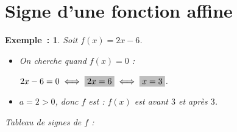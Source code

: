 \documentclass[12pt]{article}
\theoremstyle{break}
\theoremstyle{inline}
\newtheorem*{example*}{Exemple~:}
\begin{document}
\newpage

\section{Signe d'une fonction affine}

\begin{minipage}[c]{0.56\linewidth}
  \begin{example*}
    Soit $f(x) = 2x - 6$.

      \begin{itemize}
        \item On cherche quand $f(x) = 0$ :

        $2x - 6 = 0 \iff \hideM{2x = 6} \iff \hideM{x = 3}$.
        \item $a = 2 > 0$, donc $f$ est  : $f(x)$ est  avant $3$ et  après $3$.
      \end{itemize}

      \medskip
      Tableau de signes de $f$ :

      \begin{center}
      \end{center}
  \end{example*}
\end{minipage}
\hfill
\begin{minipage}[c]{0.4\linewidth}
  \centering
\end{minipage}
\end{document}
